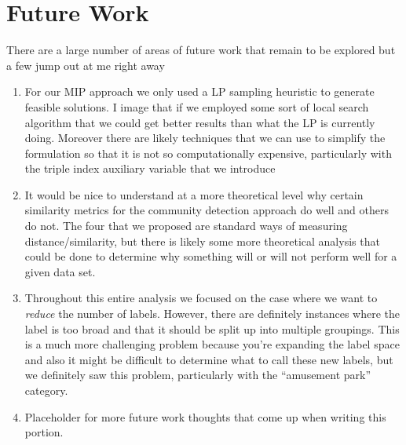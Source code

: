 \documentclass[../thesis.tex]{subfiles}
\begin{document}
\section{Future Work}
There are a large number of areas of future work that remain to be explored but a few jump out at me right away
\begin{enumerate}
    \item For our MIP approach we only used a LP sampling heuristic to generate feasible solutions. I image that if we employed some sort of local search algorithm that we could get better results than what the LP is currently doing. Moreover there are likely techniques that we can use to simplify the formulation so that it is not so computationally expensive, particularly with the triple index auxiliary variable that we introduce
    \item It would be nice to understand at a more theoretical level why certain similarity metrics for the community detection approach do well and others do not. The four that we proposed are standard ways of measuring distance/similarity, but there is likely some more theoretical analysis that could be done to determine why something will or will not perform well for a given data set.
    \item Throughout this entire analysis we focused on the case where we want to \textit{reduce} the number of labels. However, there are definitely instances where the label is too broad and that it should be split up into multiple groupings. This is a much more challenging problem because you're expanding the label space and also it might be difficult to determine what to call these new labels, but we definitely saw this problem, particularly with the ``amusement park'' category.
    \item Placeholder for more future work thoughts that come up when writing this portion.
\end{enumerate}
\end{document}
